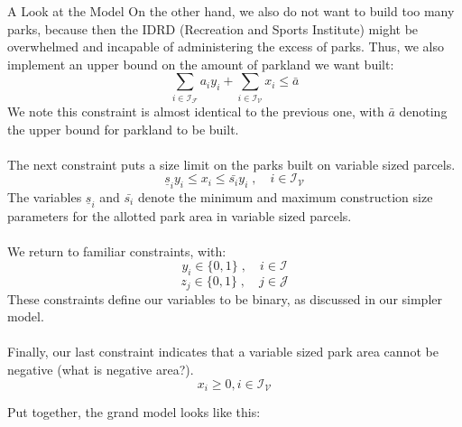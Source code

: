 \documentclass[12pt]{pom_thesis}
\theoremstyle{definition}
\begin{document}
\begin{chapter}{A Look at the Model}
On the other hand, we also do not want to build too many parks, because then the IDRD (Recreation and Sports Institute) might be overwhelmed and incapable of administering the excess of parks. Thus, we also implement an upper bound on the amount of parkland we want built:
\begin{equation} \label{constraint-10}
\sum_{i \in \mathcal{I_F}} a_iy_i + \sum_{i \in \mathcal{I_V}} x_i  \leq \bar{a}
\end{equation}
We note this constraint is almost identical to the previous one, with $\bar{a}$ denoting the upper bound for parkland to be built. \\ \\
%
The next constraint puts a size limit on the parks built on variable sized parcels.
\begin{equation} \label{constraint-11}
\underline{s}_iy_i \leq x_i \leq \bar{s_i}y_i \;, \quad i \in \mathcal{I_V}
\end{equation}
The variables $\underline{s}_i$ and $\bar{s_i}$ denote the minimum and maximum construction size parameters for the allotted park area in variable sized parcels. \\ \\
%
We return to familiar constraints, with:
\begin{equation} \label{constraint-12}
y_i \in \{0,1\} \; , \quad i \in \mathcal{I} 
\end{equation}
%
\begin{equation} \label{constraint-13}
z_j \in \{0,1\} \; , \quad j \in \mathcal{J} 
\end{equation}
These constraints define our variables to be binary, as discussed in our simpler model. \\ \\
%
Finally, our last constraint indicates that a variable sized park area cannot be negative (what is negative area?).
\begin{equation}
x_i \geq 0, i \in \mathcal{I_V}
\end{equation}

Put together, the grand model looks like this: 


\end{chapter}
\end{document}
